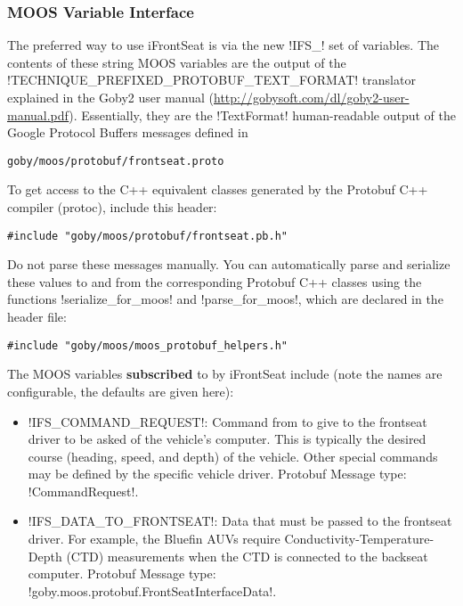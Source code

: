 \subsubsection{MOOS Variable Interface}

The preferred way to use iFrontSeat is via the new !IFS_! set of variables. The contents of these string MOOS variables are the output of the !TECHNIQUE_PREFIXED_PROTOBUF_TEXT_FORMAT! translator explained in the Goby2 user manual (\url{http://gobysoft.com/dl/goby2-user-manual.pdf}). Essentially, they are the !TextFormat! human-readable output of the Google Protocol Buffers messages defined in
\begin{verbatim}
goby/moos/protobuf/frontseat.proto
\end{verbatim}

To get access to the C++ equivalent classes generated by the Protobuf C++ compiler (protoc), include this header:
\begin{verbatim}
#include "goby/moos/protobuf/frontseat.pb.h"
\end{verbatim}

Do not parse these messages manually. You can automatically parse and serialize these values to and from the corresponding Protobuf C++ classes using the functions !serialize_for_moos! and !parse_for_moos!, which are declared in the header file:
\begin{verbatim}
#include "goby/moos/moos_protobuf_helpers.h" 
\end{verbatim}

The MOOS variables \textbf{subscribed} to by iFrontSeat include (note the names are configurable, the defaults are given here):
\begin{itemize}
\item !IFS_COMMAND_REQUEST!: Command from to give to the frontseat driver to be asked of the vehicle's computer. This is typically the desired course (heading, speed, and depth) of the vehicle. Other special commands may be defined by the specific vehicle driver. Protobuf Message type:  !CommandRequest!.
\item !IFS_DATA_TO_FRONTSEAT!: Data that must be passed to the frontseat driver. For example, the Bluefin AUVs require Conductivity-Temperature-Depth (CTD) measurements when the CTD is connected to the backseat computer. Protobuf Message type: !goby.moos.protobuf.FrontSeatInterfaceData!.
\end{itemize}

